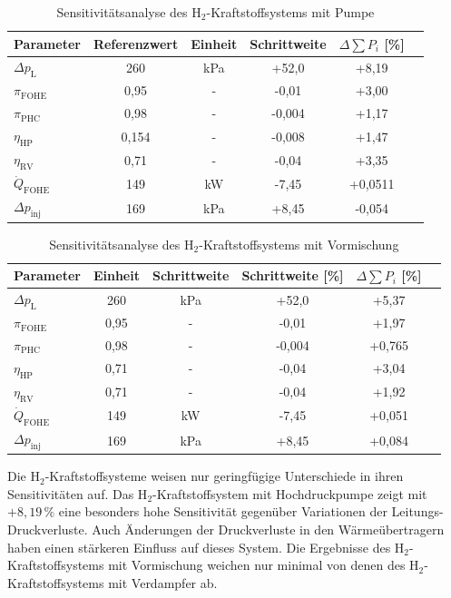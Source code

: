 \begin{table}[ht]
	\centering
	\caption{Sensitivitätsanalyse des H$_2$-Kraftstoffsystems mit Pumpe}
	\begin{tabular} {|l|c|c|c|c|c|} \hline%
		Parameter & Referenzwert & Einheit & Schrittweite & $ \Delta \sum P_i$ [\%] \\ \hline\hline%
		$\Delta p_\mathrm{L}$ & 260 & \si{\kilo\Pa} & +52,0 & +8,19 \\ \hline 
		$\pi_\mathrm{FOHE}$ & 0,95 & - & -0,01 & +3,00 \\ \hline 
		$\pi_\mathrm{PHC}$ & 0,98 & - & -0,004 & +1,17 \\ \hline 
		$\eta_\mathrm{HP}$ & 0,154 & - & -0,008 & +1,47 \\ \hline 
		$\eta_\mathrm{RV}$ & 0,71 & - & -0,04 & +3,35 \\ \hline 
		$\dot{Q}_\mathrm{FOHE}$ & 149 & \si{\kilo\W} & -7,45 & +0,0511 \\ \hline 
		$\Delta p_\mathrm{inj}$ & 169 & \si{\kilo\Pa} & +8,45 & -0,054 \\ \hline   
	\end{tabular}	
	\label{Tab:senspump}%
\end{table}
\FloatBarrier 

\begin{table}[ht]
	\centering
	\caption{Sensitivitätsanalyse des H$_2$-Kraftstoffsystems mit Vormischung}
	\begin{tabular} {|l|c|c|c|c|c|} \hline%
		Parameter & Einheit & Schrittweite & Schrittweite [\%] & $ \Delta \sum P_i$ [\%] \\ \hline\hline%
		$\Delta p_\mathrm{L}$ & 260 & \si{\kilo\Pa} & +52,0 & +5,37 \\ \hline 
		$\pi_\mathrm{FOHE}$ & 0,95 & - & -0,01 & +1,97 \\ \hline 
		$\pi_\mathrm{PHC}$ & 0,98 & - & -0,004 & +0,765 \\ \hline 
		$\eta_\mathrm{HP}$ & 0,71 & - & -0,04 & +3,04 \\ \hline 
		$\eta_\mathrm{RV}$ & 0,71 & - & -0,04 & +1,92 \\ \hline 
		$\dot{Q}_\mathrm{FOHE}$ & 149 & \si{\kilo\W} & -7,45 & +0,051 \\ \hline 
		$\Delta p_\mathrm{inj}$ & 169 & \si{\kilo\Pa} & +8,45 & +0,084 \\ \hline  
	\end{tabular}	
	\label{Tab:sensdual}%
\end{table}
\FloatBarrier 

Die H$_2$-Kraftstoffsysteme weisen nur geringfügige Unterschiede in ihren Sensitivitäten auf. Das H$_2$-Kraftstoffsystem mit Hochdruckpumpe zeigt mit $+8,19\,\%$ eine besonders hohe Sensitivität gegenüber Variationen der Leitungs-Druckverluste. Auch Änderungen der Druckverluste in den Wärmeübertragern haben einen stärkeren Einfluss auf dieses System. Die Ergebnisse des H$_2$-Kraftstoffsystems mit Vormischung weichen nur minimal von denen des H$_2$-Kraftstoffsystems mit Verdampfer ab.


